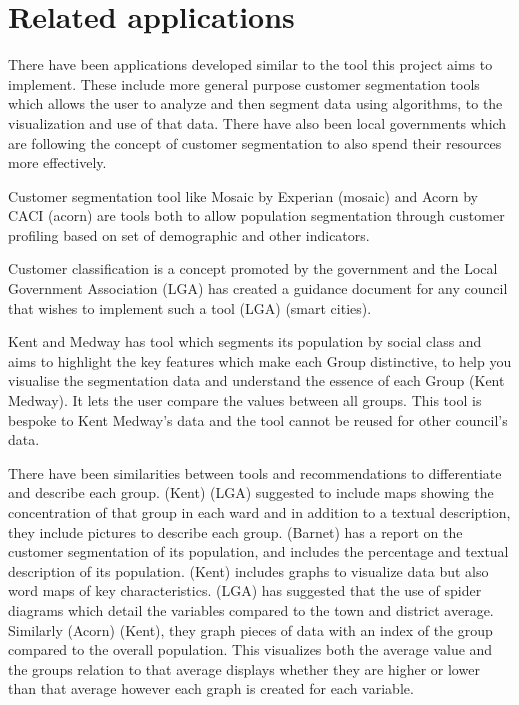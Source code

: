 \section{Related applications}

There have been applications developed similar to the tool this project aims to implement. These include more general purpose customer segmentation tools which allows the user to analyze and then segment data using algorithms, to the visualization and use of that data. There have also been local governments which are following the concept of customer segmentation to also spend their resources more effectively.\par

Customer segmentation tool like Mosaic by Experian (mosaic) and Acorn by CACI (acorn) are tools both to allow population segmentation through customer profiling based on set of demographic and other indicators.\par

Customer classification is a concept promoted by the government and the Local Government Association (LGA) has created a guidance document for any council that wishes to implement such a tool (LGA) (smart cities). \par

Kent and Medway has tool which segments its population by social class and aims to highlight the key features which make each Group distinctive, to help you visualise the segmentation data and understand the essence of each Group (Kent  Medway). It lets the user compare the values between all groups. This tool is bespoke to Kent  Medway’s data and the tool cannot be reused for other council’s data.\par

There have been similarities between tools and recommendations to differentiate and describe each group. (Kent) (LGA) suggested to include maps showing the concentration of that group in each ward and in addition to a textual description, they include pictures to describe each group. (Barnet) has a report on the customer segmentation of its population, and includes the percentage and textual description of its population. (Kent) includes graphs to visualize data but also word maps of key characteristics. (LGA) has suggested that the use of spider diagrams which detail the variables compared to the town and district average. Similarly (Acorn) (Kent), they graph pieces of data with an index of the group compared to the overall population. This visualizes both the average value and the groups relation to that average displays whether they are higher or lower than that average however each graph is created for each variable.\par

